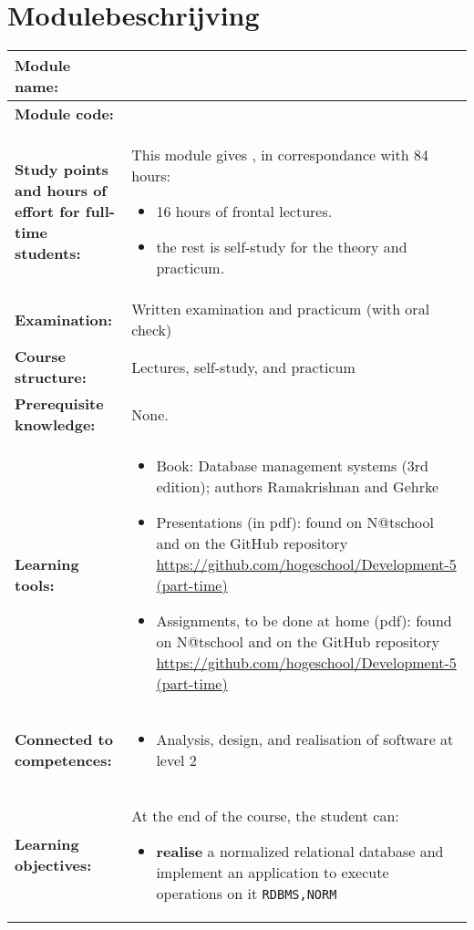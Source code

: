 \section*{Modulebeschrijving}
\begin{tabularx}{\textwidth}{|>{\columncolor{lichtGrijs}} p{}|X|}
	\hline
	\textbf{Module name:} & \modulenaam\\
	\hline
	\textbf{Module code: }& \modulecode\\
	\hline
	\textbf{Study points \newline and hours of effort for full-time students:} & This module gives \stdPunten, in correspondance with 84 hours:
	\begin{itemize}
		\item 16 hours of frontal lectures.
		\item the rest is self-study for the theory and practicum.
	\end{itemize} \\
	\hline
	\textbf{Examination:} & Written examination and practicum (with oral check) \\
	\hline
	\textbf{Course structure:} & Lectures, self-study, and practicum \\
	\hline
	\textbf{Prerequisite knowledge:} & None. \\
	\hline
	\textbf{Learning tools:}  &
		\begin{itemize}
			\item Book: Database management systems (3rd edition); authors Ramakrishnan and Gehrke
			\item Presentations (in pdf): found on N@tschool and on the GitHub repository \url{https://github.com/hogeschool/Development-5 (part-time)}
			\item Assignments, to be done at home (pdf): found on N@tschool and on the GitHub repository \url{https://github.com/hogeschool/Development-5 (part-time)}
		\end{itemize} \\
	\hline
	\textbf{Connected to \newline competences:} &
		\begin{itemize}
			\item Analysis, design, and realisation of software at level 2
		\end{itemize} \\
	\hline
	\textbf{Learning objectives:} &
		At the end of the course, the student can:
			\begin{itemize}
				\item \textbf{realise} a normalized relational database and implement an application to execute operations on it \texttt{RDBMS,NORM}


\end{itemize}
\end{tabularx}
